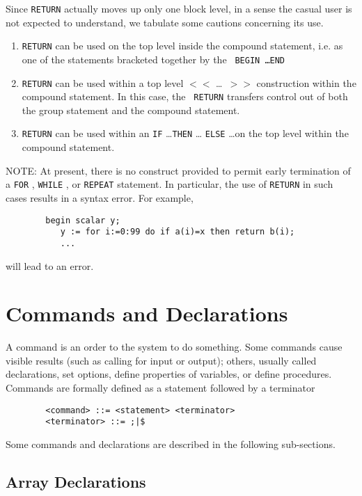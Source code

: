 Since {\tt RETURN}  actually moves up only one
block level, in a sense the casual user is not expected to
understand, we tabulate some cautions concerning its use.
\begin{enumerate}
\item {\tt RETURN} can be used on the top level inside the compound
statement, i.e. as one of the statements bracketed together by the {\tt
BEGIN \ldots END}

\item {\tt RETURN} can be used within a top level {\tt $<<$} \ldots {\tt
$>>$} construction within the compound statement.  In this case, the {\tt
RETURN} transfers control out of both the group statement and the compound
statement.

\item {\tt RETURN} can be used within an {\tt IF} \ldots {\tt THEN} \ldots
{\tt ELSE} \ldots on the top level within the compound statement.
\end{enumerate}
NOTE:  At present, there is no construct provided to permit early
termination of a {\tt FOR} , {\tt WHILE} ,
or {\tt REPEAT}  statement.  In particular, the use of
{\tt RETURN} in such cases results in a syntax error.  For example,
\begin{verbatim}
        begin scalar y;
           y := for i:=0:99 do if a(i)=x then return b(i);
           ...
\end{verbatim}
will lead to an error.

\chapter{Commands and Declarations}

A command is an order to the system to do something.  Some
commands cause visible results (such as calling for input or output);
others, usually called declarations, set options,
define properties of variables, or define procedures.  Commands are
formally defined as a statement followed by a terminator
\begin{verbatim}
        <command> ::= <statement> <terminator>
        <terminator> ::= ;|$
\end{verbatim}
Some {\REDUCE} commands and declarations are described in the following
sub-sections.

\section{Array Declarations}

